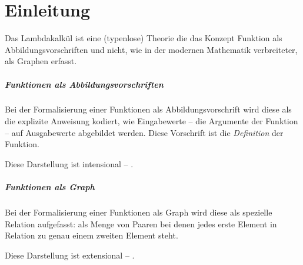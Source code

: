 \chapter{Einleitung}

Das Lambdakalkül ist eine (typenlose) Theorie die das Konzept Funktion als 
Abbildungsvorschriften und nicht, wie in der modernen Mathematik verbreiteter, 
als Graphen erfasst\autocite{Barendregt2012}.

\paragraph{Funktionen als Abbildungsvorschriften }

Bei der Formalisierung einer Funktionen als Abbildungsvorschrift wird 
diese als die explizite Anweisung kodiert, 
wie Eingabewerte -- die Argumente der Funktion -- 
auf Ausgabewerte abgebildet werden.
Diese Vorschrift ist die \emph{Definition} der Funktion.

Diese Darstellung ist intensional -- .


\paragraph{Funktionen als Graph}

Bei der Formalisierung einer Funktionen als Graph 
wird diese als spezielle Relation aufgefasst: 
als Menge von Paaren bei denen jedes erste Element in Relation zu genau
einem zweiten Element steht.

\begin{comment}
Definition Funktionsgraph: https://de.wikipedia.org/wiki/Funktionsgraph
\end{comment}

Diese Darstellung ist extensional -- .


